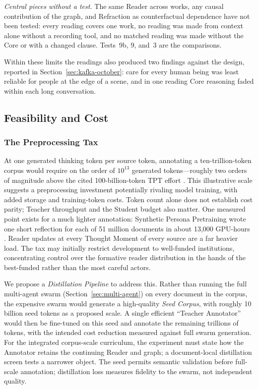 \documentclass[11pt]{article}
\begin{document}
\emph{Central pieces without a test.} The same Reader across works, any causal
contribution of the graph, and Refraction as counterfactual dependence have
not been tested: every reading covers one work, no reading was made from
context alone without a recording tool, and no matched reading was made
without the Core or with a changed clause. Tests~9b, 9, and~3 are the comparisons.

Within these limits the readings also produced two findings against the
design, reported in Section~\ref{sec:kafka-october}: care for every human
being was least reliable for people at the edge of a scene, and in one reading
Core reasoning faded within each long conversation.

\subsection{Feasibility and Cost}\label{sec:feasibility}

\subsubsection{The Preprocessing Tax}\label{sec:preprocessing-tax}

At one generated thinking token per source token, annotating a ten-trillion-token
corpus would require on the order of $10^{13}$ generated tokens---roughly two
orders of magnitude above the cited 100-billion-token TPT effort
\cite{nvidia2025tpt}. This illustrative scale suggests a preprocessing investment
potentially rivaling model training, with added storage and training-token costs.
Token count alone does not establish cost parity; Teacher throughput and the
Student budget also matter. One measured point exists for a much lighter
annotation: Synthetic Persona Pretraining wrote one short reflection for each
of 51 million documents in about 13,000 GPU-hours \cite{minder2026spp}. Reader
updates at every Thought Moment of every source are a far heavier load. The tax may initially restrict development to
well-funded institutions, concentrating control over the formative reader
distribution in the hands of the best-funded rather than the most careful
actors.

We propose a \emph{Distillation Pipeline} to address this. Rather than running the full multi-agent swarm (Section~\ref{sec:multi-agent}) on every document in the corpus, the expensive swarm would generate a high-quality \emph{Seed Corpus}, with roughly 10 billion seed tokens as a proposed scale. A single efficient ``Teacher Annotator'' would then be fine-tuned on this seed and annotate the remaining trillions of tokens, with the intended cost reduction measured against full swarm generation. For the integrated corpus-scale curriculum, the experiment must state how the Annotator retains the continuing Reader and graph; a document-local distillation screen tests a narrower object. The seed permits semantic validation before full-scale annotation; distillation loss measures fidelity to the swarm, not independent quality.
\end{document}
